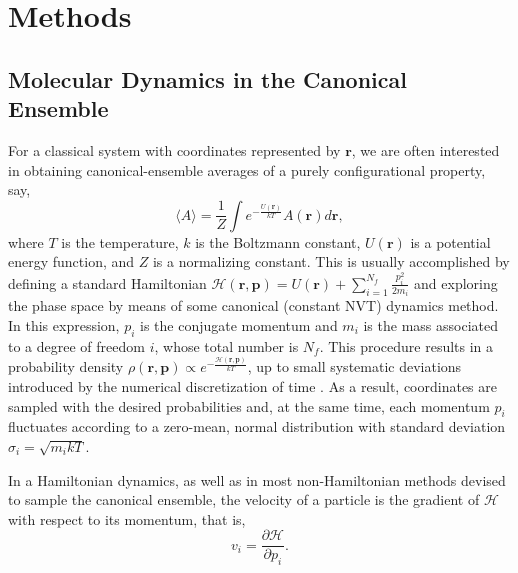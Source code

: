 \documentclass[
aip,
jcp,
reprint,
]{revtex4-1}
\newcommand{\vt}[1]{\boldsymbol{\mathbf{#1}}}          %
\newcommand{\diff}[2]{\frac{\partial #2}{\partial #1}} %
\begin{document}
\section{Methods}
\label{sec:methods}

\subsection{Molecular Dynamics in the Canonical Ensemble}
\label{sec:standard canonical ensemble}

For a classical system with coordinates represented by $\vt r$, we are often interested in obtaining canonical-ensemble averages of a purely configurational property, say,
\begin{equation*}
\label{eq:configurational average}
\langle A \rangle = \frac{1}{Z} \int e^{-\frac{U(\vt r)}{kT}} A(\vt r) d\vt r,
\end{equation*}
where $T$ is the temperature, $k$ is the Boltzmann constant, $U(\vt r)$ is a potential energy function, and $Z$ is a normalizing constant.
This is usually accomplished by defining a standard Hamiltonian $\mathcal{H}(\vt r, \vt p) = U(\vt r) + \sum_{i=1}^{N_f} \frac{p_i^2}{2 m_i}$ and exploring the phase space by means of some canonical (constant NVT) dynamics method.
In this expression, $p_i$ is the conjugate momentum and $m_i$ is the mass associated to a degree of freedom $i$, whose total number is $N_f$.
This procedure results in a probability density $\rho(\vt r, \vt p) \propto e^{-\frac{\mathcal{H}(\vt r, \vt p)}{kT}}$, up to small systematic deviations introduced by the numerical discretization of time \cite{Eastwood_2010, Davidchack_2010, Silveira_2017a, Silveira_2019a}.
As a result, coordinates are sampled with the desired probabilities and, at the same time, each momentum $p_i$ fluctuates according to a zero-mean, normal distribution with standard deviation $\sigma_i = \sqrt{m_i k T}$.

In a Hamiltonian dynamics, as well as in most non-Hamiltonian methods devised to sample the canonical ensemble, the velocity of a particle is the gradient of $\mathcal{H}$ with respect to its momentum, that is,
\begin{equation}
\label{eq:velocity as momentum gradient}
v_i = \diff{p_i}{{\mathcal H}}.
\end{equation}
\end{document}
